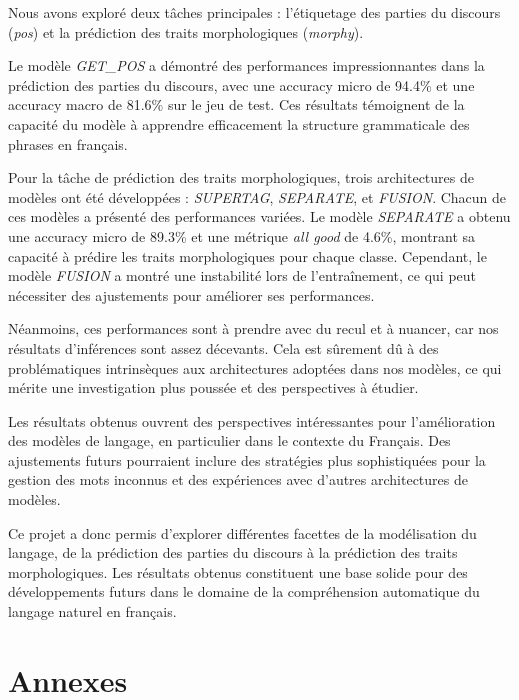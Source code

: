 \documentclass[a4paper]{article}
\begin{document}
Nous avons exploré deux tâches principales : l'étiquetage des parties du discours (\textit{pos}) et la prédiction des traits
morphologiques (\textit{morphy}). 

Le modèle \textit{GET\_POS} a démontré des performances impressionnantes dans la prédiction des parties du discours, avec une
accuracy micro de 94.4\% et une accuracy macro de 81.6\% sur le jeu de test. Ces résultats témoignent de la capacité du modèle
à apprendre efficacement la structure grammaticale des phrases en français.

Pour la tâche de prédiction des traits morphologiques, trois architectures de modèles ont été développées : \textit{SUPERTAG},
\textit{SEPARATE}, et \textit{FUSION}. Chacun de ces modèles a présenté des performances variées. Le modèle \textit{SEPARATE} a
obtenu une accuracy micro de 89.3\% et une métrique \textit{all good} de 4.6\%, montrant sa capacité à prédire les traits
morphologiques pour chaque classe. Cependant, le modèle \textit{FUSION} a montré une instabilité lors de l'entraînement, ce
qui peut nécessiter des ajustements pour améliorer ses performances.

Néanmoins, ces performances sont à prendre avec du recul et à nuancer, car nos résultats d'inférences sont assez décevants. Cela est 
sûrement dû à des problématiques intrinsèques aux architectures adoptées dans nos modèles, ce qui mérite une investigation plus 
poussée et des perspectives à étudier. 

Les résultats obtenus ouvrent des perspectives intéressantes pour l'amélioration des modèles de langage, en particulier dans le
contexte du Français. Des ajustements futurs pourraient inclure des stratégies plus sophistiquées pour la gestion des mots
inconnus et des expériences avec d'autres architectures de modèles.

Ce projet a donc permis d'explorer différentes facettes de la modélisation du langage, de la prédiction des parties du discours à
la prédiction des traits morphologiques. Les résultats obtenus constituent une base solide pour des développements futurs dans le
domaine de la compréhension automatique du langage naturel en français.


\section{Annexes}
\label{sec: Annexes}
\end{document}
